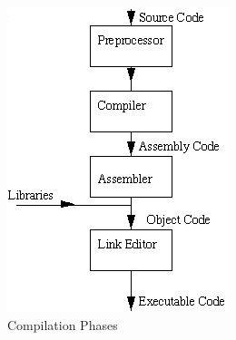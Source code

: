 \documentclass[11pt,a4paper]{article}
\begin{document}
\begin{figure}[ht]
\begin{center}
\includegraphics[scale=0.5]{CompilingStages.png}
\end{center}
\caption{Compilation Phases}
\label{ccStages}
\end{figure}
\end{document}

